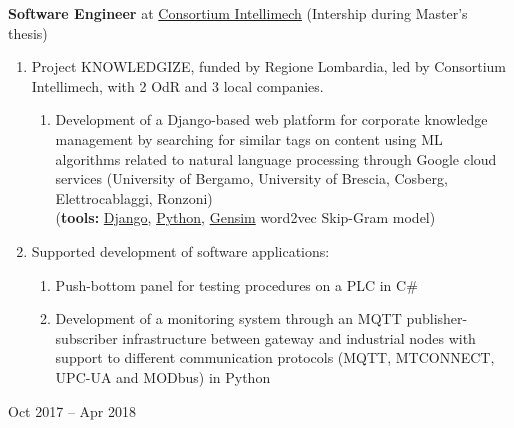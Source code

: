 \documentclass[10pt]{article}
\begin{document}
\vspace{6pt} %

\noindent
\begin{minipage}[t]{.8\textwidth}
	\raggedright
	\textbf{Software Engineer} at \href{https://www.intellimech.it/}{Consortium Intellimech} (Intership during Master's thesis)
	\begin{enumerate}
		\item Project KNOWLEDGIZE, funded by Regione Lombardia, led by Consortium Intellimech, with 2 OdR and 3 local companies.
		  \begin{enumerate}
			\item Development of a Django-based web platform for corporate knowledge management by searching for similar tags on content using ML algorithms related to natural language processing through Google cloud services ({\small University of Bergamo, University of Brescia, Cosberg, Elettrocablaggi, Ronzoni})\\
			({\scriptsize \textbf{tools:} \href{https://www.djangoproject.com/}{Django}, \href{https://www.python.org/}{Python}, \href{https://github.com/RaRe-Technologies/gensim}{Gensim} word2vec Skip-Gram model})
		\end{enumerate}
		\item Supported development of software applications:
		  \begin{enumerate}
			\item Push-bottom panel for testing procedures on a PLC in C\#
			\item Development of a monitoring system through an MQTT publisher-subscriber infrastructure between gateway and industrial nodes with support to different communication protocols (MQTT, MTCONNECT, UPC-UA and MODbus) in Python
		\end{enumerate}
  \end{enumerate}
\end{minipage}%
\hfill\vrule\hfill
\begin{minipage}[t]{.16\textwidth}
	\raggedleft
	Oct 2017 – Apr 2018
\end{minipage}

\end{document}
